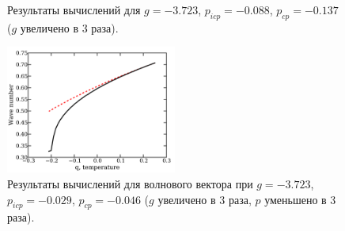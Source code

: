 \begin{figure}[p]\label{fig:gx3}
\centering
{}
\newline
{}
\newline
\caption{Результаты вычислений для $g= -3.723$, $p_{icp}= -0.088$, $p_{cp}=-0.137$ ($g$ увеличено в 3 раза).}
\end{figure}

\begin{figure}\label{fig:gx3p!3-wn}
\includegraphics[width = 0.5\textwidth]{figs/gx3p_3-wn.pdf}
\caption{Результаты вычислений для волнового вектора при $g= -3.723$, $p_{icp}= -0.029$, $p_{cp}=-0.046$ ($g$ увеличено в 3 раза, $p$ уменьшено в 3 раза).}
\end{figure}

